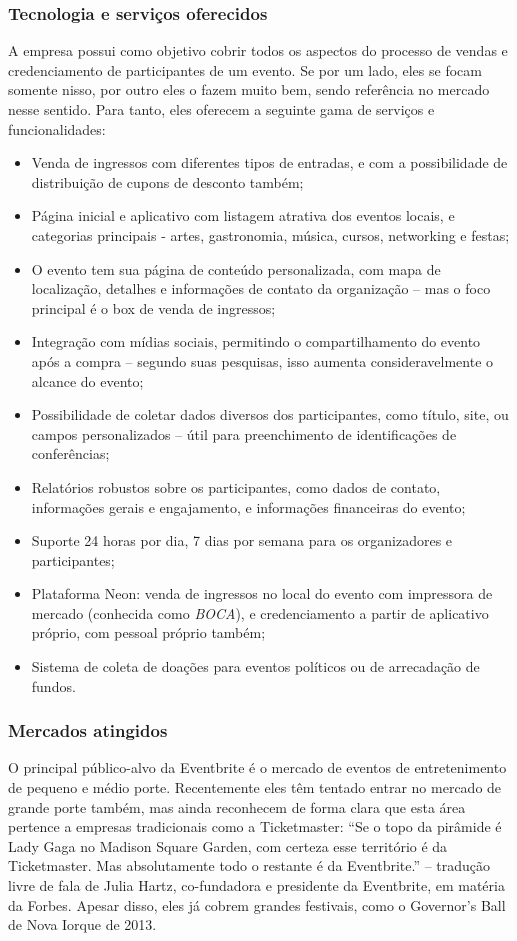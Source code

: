 \documentclass[12pt,a4paper,twoside,hyphens,english,brazil]{abntex2}
\begin{document}
\subsubsection*{Tecnologia e serviços oferecidos}
A empresa possui como objetivo cobrir todos os aspectos do processo de vendas e credenciamento de participantes de um evento. Se por um lado, eles se focam somente nisso, por outro eles o fazem muito bem, sendo referência no mercado nesse sentido. Para tanto, eles oferecem a seguinte gama de serviços e funcionalidades:
\begin{itemize}
	\item Venda de ingressos com diferentes tipos de entradas, e com a possibilidade de distribuição de cupons de desconto também;
	\item Página inicial e aplicativo com listagem atrativa dos eventos locais, e categorias principais - artes, gastronomia, música, cursos, networking e festas;
	\item O evento tem sua página de conteúdo personalizada, com mapa de localização, detalhes e informações de contato da organização -- mas o foco principal é o box de venda de ingressos;
	\item Integração com mídias sociais, permitindo o compartilhamento do evento após a compra -- segundo suas pesquisas, isso aumenta consideravelmente o alcance do evento;
	\item Possibilidade de coletar dados diversos dos participantes, como título, site, ou campos personalizados -- útil para preenchimento de identificações de conferências;
	\item Relatórios robustos sobre os participantes, como dados de contato, informações gerais e engajamento, e informações financeiras do evento;
	\item Suporte 24 horas por dia, 7 dias por semana para os organizadores e participantes;
	\item Plataforma Neon: venda de ingressos no local do evento com impressora de mercado (conhecida como \emph{BOCA}), e credenciamento a partir de aplicativo próprio, com pessoal próprio também;
	\item Sistema de coleta de doações para eventos políticos ou de arrecadação de fundos.
\end{itemize}

\subsubsection*{Mercados atingidos}
O principal público-alvo da Eventbrite é o mercado de eventos de entretenimento de pequeno e médio porte. Recentemente eles têm tentado entrar no mercado de grande porte também, mas ainda reconhecem de forma clara que esta área pertence a empresas tradicionais como a Ticketmaster: ``Se o topo da pirâmide é Lady Gaga no Madison Square Garden, com certeza esse território é da Ticketmaster. Mas absolutamente todo o restante é da Eventbrite.'' -- tradução livre de fala de Julia Hartz, co-fundadora e presidente da Eventbrite, em matéria da Forbes\cite{eventbrite-lucro-forbes}. Apesar disso, eles já cobrem grandes festivais, como o Governor's Ball de Nova Iorque de 2013.\cite{eventbrite-lucro-forbes}
\end{document}
